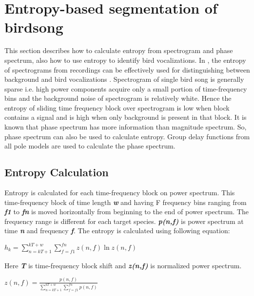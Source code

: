 \documentclass[a4paper]{article}
\begin{document}
\section{Entropy-based segmentation of birdsong}
This section describes how to calculate entropy from spectrogram and phase
spectrum, also how to use entropy to identify bird vocalizations. In
\cite{wang2013}, the entropy of spectrograms from recordings can be effectively used for distinguishing
between background and bird vocalizations \cite{6625329}. Spectrogram of single
bird song is generally sparse i.e. high power components acquire only a small
portion of time-frequency bins and the background noise of spectrogram is
relatively white. Hence  the entropy of sliding time frequency block over
spectrogram is low when block contains a signal and is high when only background
is present in that block. It is known that phase spectrum has more information
than magnitude spectrum. So, phase spectrum can also be used to calculate
entropy. Group delay functions from all pole models are used to calculate the
phase spectrum. 

\subsection{Entropy Calculation}
Entropy is calculated for each time-frequency block on power spectrum. This time-frequency block of time length \textbf{\textit{w}} and having F frequency bins ranging from \textbf{\textit{f1}} to  \textbf{\textit{fn}} is moved horizontally from beginning to the end of power spectrum. The frequency range is different for each target species. \textbf{\textit{p(n,f)}} is power spectrum at time \textbf{\textit{n}} and frequency  \textbf{\textit{f}}. The entropy is calculated using following equation:

\hspace{1cm}

  $h_{k}=\sum_{n=kT+1}^{kT+w}\sum_{f=f1}^{fn}z(n,f) \ln z(n,f)$

 \hspace{1cm}
 
Here \textbf{\textit{T}} is time-frequency block shift and \textbf{\textit{z(n,f)}} is normalized power spectrum.


\hspace{1cm}

$z(n,f)=\frac {p(n,f)}
{\sum_{n=kT+1}^{kT+w}\sum_{f=f1}^{fn} p(n,f)}$

\hspace{1cm}
\end{document}
